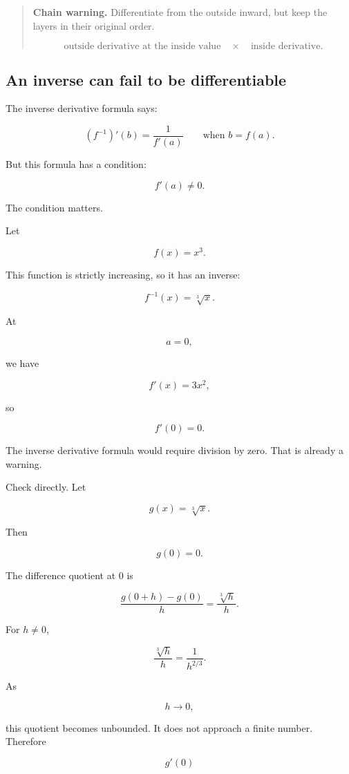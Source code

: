 \begin{quote}
\textbf{Chain warning.}
Differentiate from the outside inward, but keep the layers in their original order.

\[
\text{outside derivative at the inside value}
\quad \times \quad
\text{inside derivative}.
\]
\end{quote}

\subsection{An inverse can fail to be differentiable}
\label{subsec:inverse-can-fail-differentiable-warning}

The inverse derivative formula says:

\[
(f^{-1})'(b)=\frac1{f'(a)}
\qquad
\text{when } b=f(a).
\]

But this formula has a condition:

\[
f'(a)\neq0.
\]

The condition matters.

Let

\[
f(x)=x^3.
\]

This function is strictly increasing, so it has an inverse:

\[
f^{-1}(x)=\sqrt[3]{x}.
\]

At

\[
a=0,
\]

we have

\[
f'(x)=3x^2,
\]

so

\[
f'(0)=0.
\]

The inverse derivative formula would require division by zero.  That is already a warning.

Check directly.  Let

\[
g(x)=\sqrt[3]{x}.
\]

Then

\[
g(0)=0.
\]

The difference quotient at \(0\) is

\[
\frac{g(0+h)-g(0)}{h}
=
\frac{\sqrt[3]{h}}{h}.
\]

For \(h\neq0\),

\[
\frac{\sqrt[3]{h}}{h}
=
\frac{1}{h^{2/3}}.
\]

As

\[
h\to0,
\]

this quotient becomes unbounded.  It does not approach a finite number.  Therefore

\[
g'(0)
\]

